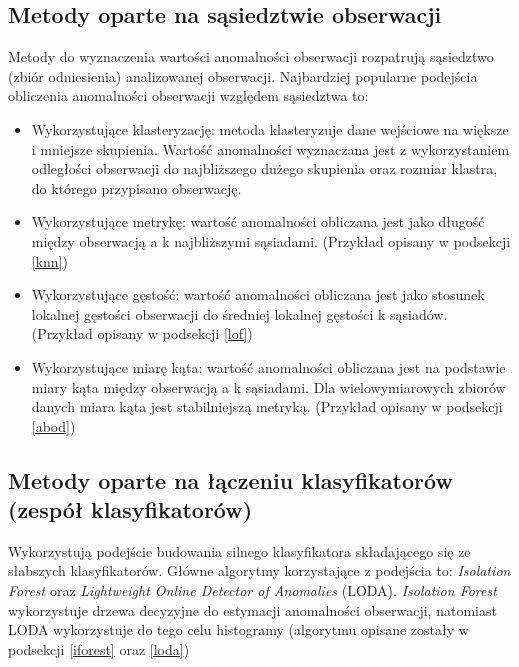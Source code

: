    \subsection {Metody oparte na sąsiedztwie obserwacji}
Metody do wyznaczenia wartości anomalności obserwacji rozpatrują sąsiedztwo (zbiór odniesienia) analizowanej obserwacji. Najbardziej popularne podejścia obliczenia anomalności obserwacji względem sąsiedztwa to:
\begin{itemize}
    \item Wykorzystujące klasteryzację: metoda klasteryzuje dane wejściowe na większe i mniejsze skupienia. Wartość anomalności wyznaczana jest z wykorzystaniem odległości obserwacji do najbliższego dużego skupienia oraz rozmiar klastra, do którego przypisano obserwację.
    \item Wykorzystujące metrykę: wartość anomalności obliczana jest jako długość między obserwacją a k najbliższymi sąsiadami. (Przykład opisany w podsekcji \ref{knn})
    \item Wykorzystujące gęstość: wartość anomalności obliczana jest jako stosunek lokalnej gęstości obserwacji do średniej lokalnej gęstości k sąsiadów. (Przykład opisany w podsekcji \ref{lof})
    \item Wykorzystujące miarę kąta: wartość anomalności obliczana jest na podstawie miary kąta między obserwacją a k sąsiadami. Dla wielowymiarowych zbiorów danych miara kąta jest stabilniejszą metryką. (Przykład opisany w podsekcji \ref{abod})
\end{itemize}
\subsection {Metody oparte na łączeniu klasyfikatorów (zespół klasyfikatorów)}
Wykorzystują podejście budowania silnego klasyfikatora składającego się ze słabszych klasyfikatorów. Główne algorytmy korzystające z podejścia to: \textit{Isolation Forest} oraz \textit{Lightweight Online Detector of Anomalies} (LODA). \textit{Isolation Forest} wykorzystuje drzewa decyzyjne do estymacji anomalności obserwacji, natomiast LODA wykorzystuje do tego celu histogramy (algorytmu opisane zostały w podsekcji \ref{iforest} oraz \ref{loda})
